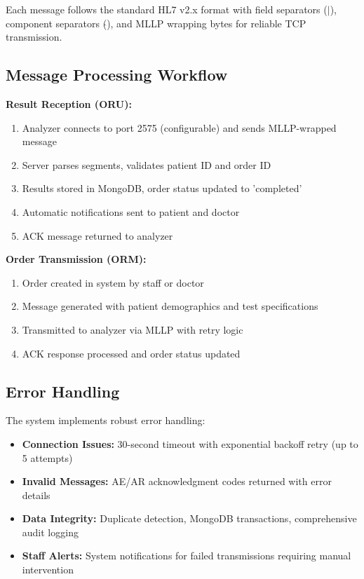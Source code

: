 \documentclass[12pt, a4paper]{report}
\begin{document}
Each message follows the standard HL7 v2.x format with field separators ($|$), component separators ($\hat{}$), and MLLP wrapping bytes for reliable TCP transmission.

\subsection{Message Processing Workflow}

\textbf{Result Reception (ORU):}
\begin{enumerate}
    \item Analyzer connects to port 2575 (configurable) and sends MLLP-wrapped message
    \item Server parses segments, validates patient ID and order ID
    \item Results stored in MongoDB, order status updated to 'completed'
    \item Automatic notifications sent to patient and doctor
    \item ACK message returned to analyzer
\end{enumerate}

\textbf{Order Transmission (ORM):}
\begin{enumerate}
    \item Order created in system by staff or doctor
    \item Message generated with patient demographics and test specifications
    \item Transmitted to analyzer via MLLP with retry logic
    \item ACK response processed and order status updated
\end{enumerate}

\subsection{Error Handling}

The system implements robust error handling:
\begin{itemize}
    \item \textbf{Connection Issues:} 30-second timeout with exponential backoff retry (up to 5 attempts)
    \item \textbf{Invalid Messages:} AE/AR acknowledgment codes returned with error details
    \item \textbf{Data Integrity:} Duplicate detection, MongoDB transactions, comprehensive audit logging
    \item \textbf{Staff Alerts:} System notifications for failed transmissions requiring manual intervention
\end{itemize}
\end{document}
